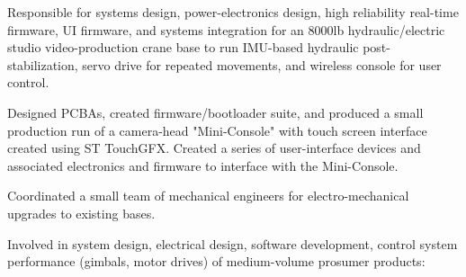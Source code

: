 \documentclass[letterpaper]{deedy-resume} %
\begin{document}
\begin{minipage}[t]{0.66\textwidth} %


\sectionspace %


\begin{tightitemize}

\item
Responsible for systems design, power-electronics design, high reliability real-time firmware, UI firmware, and systems integration for an 8000lb hydraulic/electric studio video-production crane base to run IMU-based hydraulic post-stabilization, servo drive for repeated movements, and wireless console for user control.

\item 
Designed PCBAs, created firmware/bootloader suite, and produced a small production run of a camera-head "Mini-Console" with touch screen interface created using ST TouchGFX.  Created a series of user-interface devices and associated electronics and firmware to interface with the Mini-Console.

\item Coordinated a small team of mechanical engineers for electro-mechanical upgrades to existing bases.

\end{tightitemize}
\vspace{\topsep} %

\begin{tightitemize}
\item 
Involved in system design, electrical design, software development, control system performance (gimbals, motor drives) of medium-volume prosumer products:


\end{tightitemize}
\end{minipage}
\end{document}
